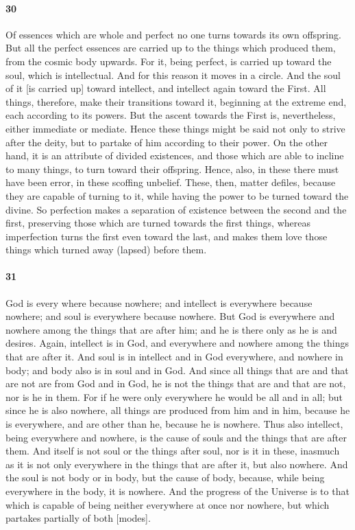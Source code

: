 \documentclass[12pt]{article}
\begin{document}
\paragraph{30} Of es\-sences which are whole and perfect no one turns towards
its own offspring. But all the perfect es\-sences are carried up to the things
which produced them, from the cosmic body upwards. For it, being perfect, is
carried up toward the soul, which is intellectual. And for this reason it moves
in a circle. And the soul of it [is carried up] toward intellect, and intellect
again toward the First. All things, therefore, make their transitions toward
it, beginning at the extreme end, each according to its powers. But the ascent
towards the First is, nevertheless, either immediate or mediate. Hence these
things might be said not only to strive after the deity, but to partake of him
according to their power. On the other hand, it is an attribute of divided
existences, and those which are able to incline to many things, to turn toward
their offspring. Hence, also, in these there must have been error, in these
scoffing unbelief. These, then, matter defiles, because they are capable of
turning to it, while having the power to be turned toward the divine. So
perfection makes a separation of existence between the second and the first,
preserving those which are turned towards the first things, whereas
imperfection turns the first even toward the last, and makes them love those
things which turned away (lapsed) before them.

\paragraph{31} God is every where because nowhere; and intellect is everywhere
because nowhere; and soul is everywhere because nowhere. But God is everywhere
and nowhere among the things that are after him; and he is there only as he is
and desires. Again, intellect is in God, and everywhere and nowhere among the
things that are after it. And soul is in intellect and in God everywhere, and
nowhere in body; and body also is in soul and in God. And since all things that
are and that are not are from God and in God, he is not the things that are and
that are not, nor is he in them. For if he were only everywhere he would be all
and in all; but since he is also nowhere, all things are produced from him and
in him, because he is everywhere, and are other than he, because he is nowhere.
Thus also intellect, being everywhere and nowhere, is the cause of souls and
the things that are after them. And itself is not soul or the things after
soul, nor is it in these, inasmuch as it is not only everywhere in the things
that are after it, but also nowhere. And the soul is not body or in body, but
the cause of body, because, while being everywhere in the body, it is nowhere.
And the progress of the Universe is to that which is capable of being neither
everywhere at once nor nowhere, but which partakes partially of both [modes].
\end{document}
